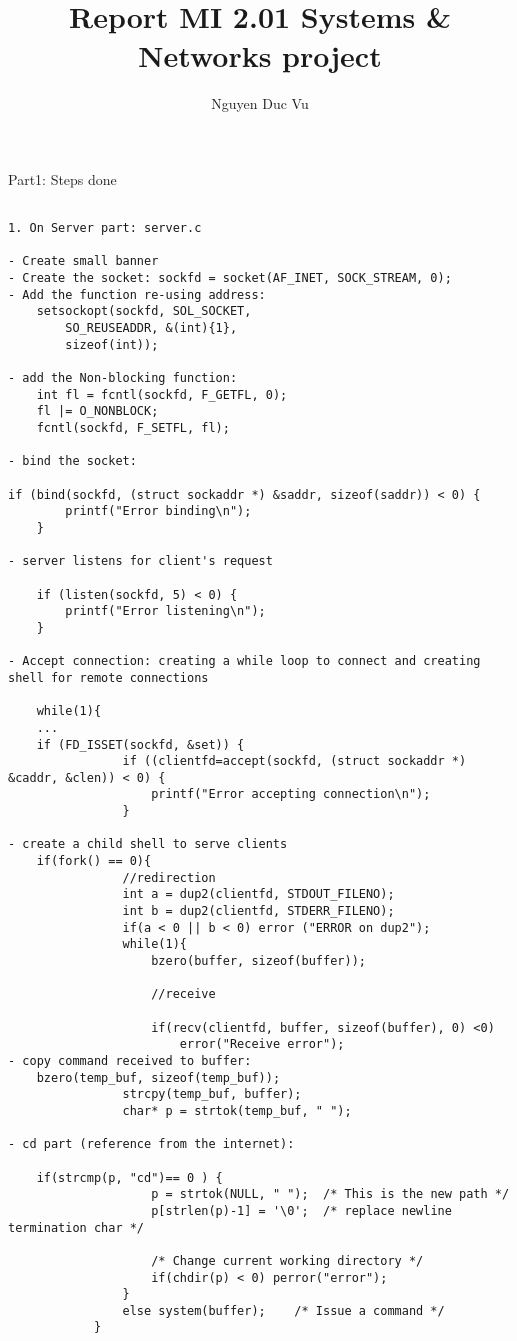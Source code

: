 \documentclass{report}
\title{Report MI 2.01 Systems & Networks project}
\author{Nguyen Duc Vu}
\begin{document}
\maketitle

\begin{section}{Part1: Steps done}


\begin{verbatim}

1. On Server part: server.c

- Create small banner
- Create the socket: sockfd = socket(AF_INET, SOCK_STREAM, 0);
- Add the function re-using address: 
	setsockopt(sockfd, SOL_SOCKET,
		SO_REUSEADDR, &(int){1},
		sizeof(int));

- add the Non-blocking function:
	int fl = fcntl(sockfd, F_GETFL, 0);
	fl |= O_NONBLOCK;
	fcntl(sockfd, F_SETFL, fl);

- bind the socket: 

if (bind(sockfd, (struct sockaddr *) &saddr, sizeof(saddr)) < 0) {
		printf("Error binding\n");
	}

- server listens for client's request

	if (listen(sockfd, 5) < 0) {
		printf("Error listening\n");
	}

- Accept connection: creating a while loop to connect and creating shell for remote connections

	while(1){
	...
	if (FD_ISSET(sockfd, &set)) {
		        if ((clientfd=accept(sockfd, (struct sockaddr *) &caddr, &clen)) < 0) {
					printf("Error accepting connection\n");
				}

- create a child shell to serve clients
	if(fork() == 0){
				//redirection
				int a = dup2(clientfd, STDOUT_FILENO);
				int b = dup2(clientfd, STDERR_FILENO);
				if(a < 0 || b < 0) error ("ERROR on dup2");
				while(1){
					bzero(buffer, sizeof(buffer));

					//receive

					if(recv(clientfd, buffer, sizeof(buffer), 0) <0)
						error("Receive error");
- copy command received to buffer:
	bzero(temp_buf, sizeof(temp_buf));				
				strcpy(temp_buf, buffer);				
				char* p = strtok(temp_buf, " ");

- cd part (reference from the internet):

	if(strcmp(p, "cd")== 0 ) {
					p = strtok(NULL, " ");  /* This is the new path */			
					p[strlen(p)-1] = '\0';  /* replace newline termination char */
					
					/* Change current working directory */					
					if(chdir(p) < 0) perror("error");				
				} 
				else system(buffer);    /* Issue a command */	
			}



\end{verbatim}
\end{section}
\end{document}
